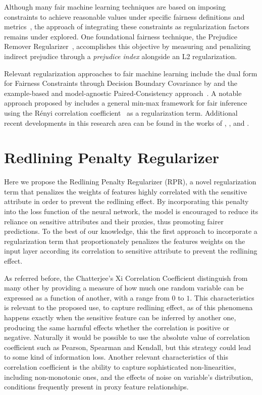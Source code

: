 Although many fair machine learning techniques are based on imposing constraints to achieve reasonable values under specific fairness definitions and metrics~\citep{Mehrabi2019,caton2023,Hort2023}, the approach of integrating these constraints as regularization factors remains under explored. One foundational fairness technique, the Prejudice Remover Regularizer~\citep{Kamishima2012}, accomplishes this objective by measuring and penalizing indirect prejudice through a \textit{prejudice index} alongside an L2 regularization.

Relevant regularization approaches to fair machine learning include the dual form for Fairness Constraints through Decision Boundary Covariance by \cite{Zafar2017b} and the example-based and model-agnostic Paired-Consistency approach~\citep{Horesh2020}. A notable approach proposed by \cite{Baharlouei2020} includes a general min-max framework for fair inference using the Rényi correlation coefficient~\citep{Renyi1959} as a regularization term. Additional recent developments in this research area can be found in the works of \cite{Olfat2020}, \cite{Yu2022}, and \cite{jung2023}.

\section{Redlining Penalty Regularizer} \label{sec:rpr_proposal}

Here we propose the Redlining Penalty Regularizer (RPR), a novel regularization term that penalizes the weights of features highly correlated with the sensitive attribute in order to prevent the redlining effect. By incorporating this penalty into the loss function of the neural network, the model is encouraged to reduce its reliance on sensitive attributes and their proxies, thus promoting fairer predictions. To the best of our knowledge, this the first approach to incorporate a regularization term that proportionately penalizes the features weights on the input layer according its correlation to sensitive attribute to prevent the redlining effect.

As referred before, the Chatterjee's Xi Correlation Coefficient distinguish from many other by providing a measure of how much one random variable can be expressed as a function of another, with a range from $0$ to $1$. This characteristics is relevant to the proposed use, to capture redlining effect, as of this phenomena happens exactly when the sensitive feature can be inferred by another one, producing the same harmful effects whether the correlation is positive or negative. Naturally it would be possible to use the absolute value of correlation coefficient such as Pearson, Spearman and Kendall, but this strategy could lead to some kind of information loss. Another relevant characteristics of this correlation coefficient is the ability to capture sophisticated non-linearities, including non-monotonic ones, and the effects of noise on variable's distribution, conditions frequently present in proxy feature relationships. 

